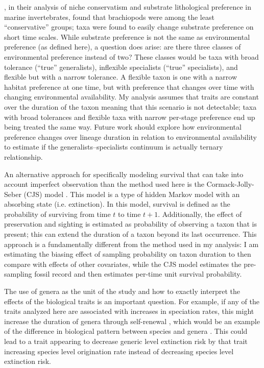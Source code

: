\documentclass{article}
\begin{document}
\citet{Hopkins2014a}, in their analysis of niche conservatism and substrate lithological preference in marine invertebrates, found that brachiopods were among the least ``conservative'' groups; taxa were found to easily change substrate preference on short time scales. While substrate preference is not the same as environmental preference (as defined here), a question does arise: are there three classes of environmental preference instead of two? These classes would be taxa with broad tolerance (``true'' generalists), inflexible specialists (``true'' specialists), and flexible but with a narrow tolerance. A flexible taxon is one with a narrow habitat preference at one time, but with preference that changes over time with changing environmental availability. My analysis assumes that traits are constant over the duration of the taxon meaning that this scenario is not detectable; taxa with broad tolerances and flexible taxa with narrow per-stage preference end up being treated the same way. Future work should explore how environmental preference changes over lineage duration in relation to environmental availability to estimate if the generalists--specialists continuum is actually ternary relationship.

An alternative approach for specifically modeling survival that can take into account imperfect observation than the method used here is the Cormack-Jolly-Seber (CJS) model \citep{Royle2008,Liow2008,Tomiya2013,Liow2010b}. This model is a type of hidden Markov model with an absorbing state (i.e. extinction). In this model, survival is defined as the probability of surviving from time \(t\) to time \(t + 1\). Additionally, the effect of preservation and sighting is estimated as probability of observing a taxon that is present; this can extend the duration of a taxon beyond its last occurrence. This approach is a fundamentally different from the method used in my analysis: I am estimating the biasing effect of sampling probability on taxon duration to then compare with effects of other covariates, while the CJS model estimates the pre-sampling fossil record and then estimates per-time unit survival probability.

The use of genera as the unit of the study and how to exactly interpret the effects of the biological traits is an important question. For example, if any of the traits analyzed here are associated with increases in speciation rates, this might increase the duration of genera through self-renewal \citep{Raup1991b,Raup1994}, which would be an example of the difference in biological pattern between species and genera \citep{Jablonski1987,Jablonski2007,Jablonski2008a}. This could lead to a trait appearing to decrease generic level extinction risk by that trait increasing species level origination rate instead of decreasing species level extinction risk. %
\end{document}
